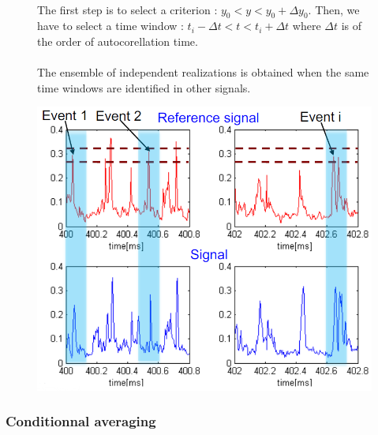 \begin{figure}[h]
    \begin{minipage}{0.5\textwidth}
        \paragraph{}
        The first step is to select a criterion : \(y_0 < y < y_0 + \Delta y_0\). Then, we have to select a time window : \(t_i - \Delta t < t < t_i + \Delta t \) where \(\Delta t\) is of the order of autocorellation time. 

        \paragraph{}
        The ensemble of independent realizations is obtained when the same time windows are identified in other signals. 
    \end{minipage}
    \begin{minipage}{0.5\textwidth}
    \centering
    \includegraphics[scale=0.4]{Figures Cours Traitement du Signal/How to build independent realizations.png}
    \caption{}
    \label{fig:how to build an ensemble of independent realizations}
    \end{minipage}
\end{figure}

\subsubsection{Conditionnal averaging}

